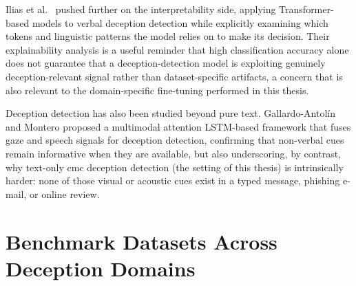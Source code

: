 Ilias et al.\ \cite{ilias2022explainable} pushed further on the interpretability side, applying Transformer-based models to verbal deception detection while explicitly examining which tokens and linguistic patterns the model relies on to make its decision. Their explainability analysis is a useful reminder that high classification accuracy alone does not guarantee that a deception-detection model is exploiting genuinely deception-relevant signal rather than dataset-specific artifacts, a concern that is also relevant to the domain-specific fine-tuning performed in this thesis.

Deception detection has also been studied beyond pure text. Gallardo-Antol{\'i}n and Montero \cite{gallardo2021detecting} proposed a multimodal attention LSTM-based framework that fuses gaze and speech signals for deception detection, confirming that non-verbal cues remain informative when they are available, but also underscoring, by contrast, why text-only \gls{cmc} deception detection (the setting of this thesis) is intrinsically harder: none of those visual or acoustic cues exist in a typed message, phishing e-mail, or online review.

\section{Benchmark Datasets Across Deception Domains}
\label{sec:lr-datasets}


